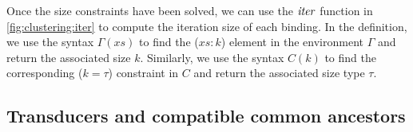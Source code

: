 Once the size constraints have been solved, we can use the $\mathit{iter}$ function in \cref{fig:clustering:iter} to compute the iteration size of each binding.
In the definition, we use the syntax $\Gamma(xs)$ to find the ($xs : k$) element in the environment $\Gamma$ and return the associated size $k$.
Similarly, we use the syntax $C(k)$ to find the corresponding ($k = \tau$) constraint in $C$ and return the associated size type $\tau$.





\subsection{Transducers and compatible common ancestors}
\label{clustering/size/transducers}

